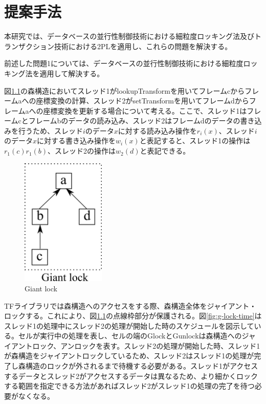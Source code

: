 \documentclass[a4paper]{jreport}	%
\begin{document}
\chapter{提案手法}
本研究では、データベースの並行性制御技術における細粒度ロッキング法及びトランザクション技術における2PLを適用し、これらの問題を解決する。

前述した問題1については、データベースの並行性制御技術における細粒度ロッキング法を適用して解決する。

図\ref{fig:giant-lock}の森構造においてスレッド1がlookupTransformを用いてフレームcからフレームaへの座標変換の計算、スレッド2がsetTransformを用いてフレームdからフレームaへの座標変換を更新する場合について考える。ここで、スレッド1はフレームcとフレームbのデータの読み込み、スレッド2はフレームdのデータの書き込みを行うため、スレッド$i$のデータ$x$に対する読み込み操作を$r_i(x)$、スレッド$i$のデータ$x$に対する書き込み操作を$w_i(x)$と表記すると、スレッド1の操作は$r_1(c)r_1(b)$、スレッド2の操作は$w_2(d)$と表記できる。


\begin{figure}[h] 
\centering
\includegraphics[width=4cm]{gaint-lock}	
\caption{Giant lock}
\label{fig:giant-lock}
\end{figure}


TFライブラリでは森構造へのアクセスをする際、森構造全体をジャイアント・ロックする。これにより、図\ref{fig:giant-lock}の点線枠部分が保護される。図\ref{fig:g-lock-time}はスレッド1の処理中にスレッド2の処理が開始した時のスケジュールを図示している。セルが実行中の処理を表し、セルの端のGlockとGunlockは森構造へのジャイアントロック、アンロックを表す。スレッド2の処理が開始した時、スレッド1が森構造をジャイアントロックしているため、スレッド2はスレッド1の処理が完了し森構造のロックが外されるまで待機する必要がある。スレッド1がアクセスするデータとスレッド2がアクセスするデータは異なるため、より細かくロックする範囲を指定できる方法があればスレッド2がスレッド1の処理の完了を待つ必要がなくなる。
\end{document}
